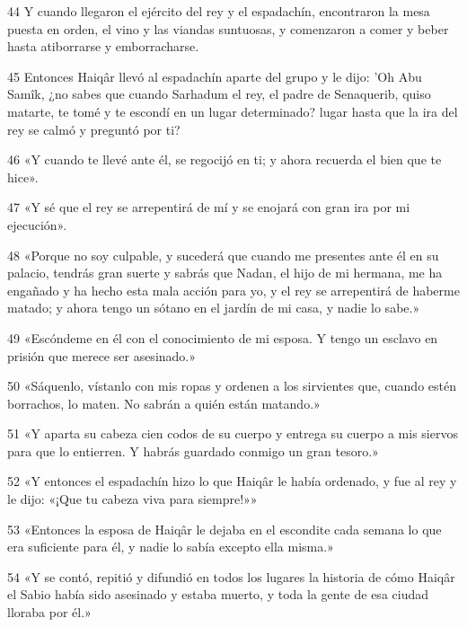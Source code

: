 \par 44 Y cuando llegaron el ejército del rey y el espadachín, encontraron la mesa puesta en orden, el vino y las viandas suntuosas, y comenzaron a comer y beber hasta atiborrarse y emborracharse.

\par 45 Entonces Haiqâr llevó al espadachín aparte del grupo y le dijo: 'Oh Abu Samîk, ¿no sabes que cuando Sarhadum el rey, el padre de Senaquerib, quiso matarte, te tomé y te escondí en un lugar determinado? lugar hasta que la ira del rey se calmó y preguntó por ti?

\par 46 «Y cuando te llevé ante él, se regocijó en ti; y ahora recuerda el bien que te hice».

\par 47 «Y sé que el rey se arrepentirá de mí y se enojará con gran ira por mi ejecución».

\par 48 «Porque no soy culpable, y sucederá que cuando me presentes ante él en su palacio, tendrás gran suerte y sabrás que Nadan, el hijo de mi hermana, me ha engañado y ha hecho esta mala acción para yo, y el rey se arrepentirá de haberme matado; y ahora tengo un sótano en el jardín de mi casa, y nadie lo sabe.»

\par 49 «Escóndeme en él con el conocimiento de mi esposa. Y tengo un esclavo en prisión que merece ser asesinado.»

\par 50 «Sáquenlo, vístanlo con mis ropas y ordenen a los sirvientes que, cuando estén borrachos, lo maten. No sabrán a quién están matando.»

\par 51 «Y aparta su cabeza cien codos de su cuerpo y entrega su cuerpo a mis siervos para que lo entierren. Y habrás guardado conmigo un gran tesoro.»

\par 52 «Y entonces el espadachín hizo lo que Haiqâr le había ordenado, y fue al rey y le dijo: «¡Que tu cabeza viva para siempre!»»

\par 53 «Entonces la esposa de Haiqâr le dejaba en el escondite cada semana lo que era suficiente para él, y nadie lo sabía excepto ella misma.»

\par 54 «Y se contó, repitió y difundió en todos los lugares la historia de cómo Haiqâr el Sabio había sido asesinado y estaba muerto, y toda la gente de esa ciudad lloraba por él.»

